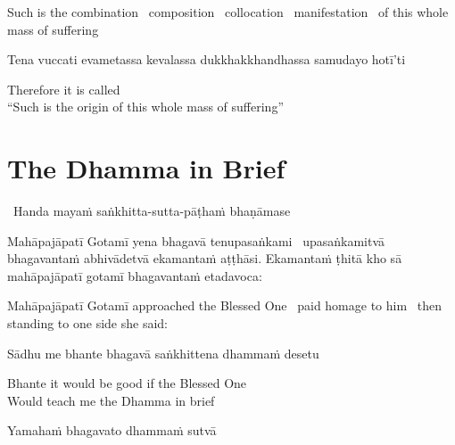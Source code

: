 \begin{english-hang}
  Such is the combination \breathmark\ composition \breathmark\ collocation \breathmark\ manifestation \breathmark\ of this whole mass of suffering
\end{english-hang}

\begin{pali-hang}
  Tena vuccati evametassa kevalassa dukkhakkhandhassa samudayo hotī'ti
\end{pali-hang}

\begin{english}
  Therefore it is called\\
  ``Such is the origin of this whole mass of suffering''
\end{english}

\suttaRef{[Vibh 130 / SN 12.2]}


\section{The Dhamma in Brief}
\label{dhamma-in-brief}

\begin{leader}
  \anglebracketleft\ \hspace{-0.5mm}Handa mayaṁ saṅkhitta-sutta-pāṭhaṁ bhaṇāmase \hspace{-0.5mm}\anglebracketright\
\end{leader}

\begin{pali-hang}
  Mahāpajāpatī Gotamī yena bhagavā tenupasaṅkami \breathmark\ upasaṅkamitvā bhagavantaṁ abhivādetvā ekamantaṁ aṭṭhāsi. Ekamantaṁ ṭhitā kho sā mahāpajāpatī gotamī bhagavantaṁ etadavoca:
\end{pali-hang}

\begin{english-hang}
  Mahāpajāpatī Gotamī approached the Blessed One \breathmark\ paid homage to him \breathmark\ then standing to one side she said:
\end{english-hang}

Sādhu me bhante bhagavā saṅkhittena dhammaṁ desetu

\begin{english}
  Bhante it would be good if the Blessed One\\
  Would teach me the Dhamma in brief
\end{english}

Yamahaṁ bhagavato dhammaṁ sutvā

